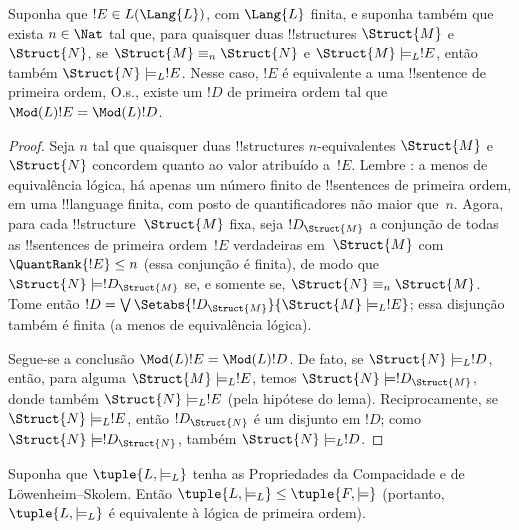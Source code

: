 \documentclass[../../../include/open-logic-section]{subfiles}
\begin{document}


\begin{lem}
Suponha que $!E \in L(\Lang{L})$, com $\Lang{L}$ finita, e suponha
também que exista $n \in \Nat$ tal que, para quaisquer duas
!!{structure}s $\Struct{M}$ e~$\Struct{N}$, se
$\Struct{M} \equiv_n \Struct{N}$ e $\Struct{M} \models_L !E$, então
também $\Struct{N} \models_L !E$. Nesse caso, $!E$ é equivalente a uma
!!{sentence} de primeira ordem, O.s.\@, existe um $!D$ de primeira
ordem tal que $\Mod(L){!E} = \Mod(L){!D}$.
\end{lem}

\begin{proof} 
Seja $n$ tal que quaisquer duas !!{structure}s $n$-equivalentes
$\Struct{M}$ e $\Struct{N}$ concordem quanto ao valor atribuído
a~$!E$. Lembre : a menos de
equivalência lógica, há apenas um número finito de !!{sentence}s de
primeira ordem, em uma !!{language} finita, com posto de quantificadores
não maior que~$n$. Agora, para cada !!{structure}~$\Struct{M}$ fixa,
seja $!D_{\Struct{M}}$ a conjunção de todas as !!{sentence}s de
primeira ordem~$!E$ verdadeiras em~$\Struct{M}$ com
$\QuantRank{!E} \le n$ (essa conjunção é finita), de modo que
$\Struct{N} \models !D_{\Struct{M}}$ se, e somente se,
$\Struct{N} \equiv_n \Struct{M}$. Tome então
$!D = \textstyle\bigvee
\Setabs{!D_{\Struct{M}}}{\Struct{M} \models_L !E}$; essa disjunção
também é finita (a menos de equivalência lógica).

Segue-se a conclusão $\Mod(L){!E} = \Mod(L){!D}$. De fato, se
$\Struct{N} \models_L !D$, então, para alguma
$\Struct{M} \models_L !E$, temos
$\Struct{N} \models !D_{\Struct{M}}$, donde também
$\Struct{N} \models_L !E$ (pela hipótese do lema). Reciprocamente, se
$\Struct{N} \models_L !E$, então $!D_\Struct{N}$ é um disjunto em
$!D$; como $\Struct{N} \models !D_\Struct{N}$, também
$\Struct{N} \models_L !D$.
\end{proof}

\begin{thm}
   Suponha que $\tuple{L, \models_L}$ tenha as
  Propriedades da Compacidade e de L\"owenheim--Skolem. Então
  $\tuple{L, \models_L} \le \tuple{F, \models}$ (portanto,
  $\tuple{L, \models_L}$ é equivalente à lógica de primeira ordem).
\end{thm}
\end{document}
